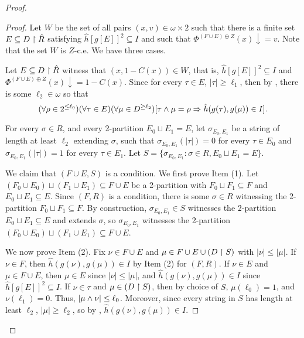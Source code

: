 \begin{proof}
\begin{proof}
Let $W$ be the set of all pairs $(x, v) \in \omega \times 2$ such that there is a finite set $E \subseteq D \upharpoonright \hat{R}$ satisfying $\hat{h}[g[E]]^2 \subseteq I$ and such that $\Phi^{(F \cup E) \oplus Z}(x) \downarrow = v$. Note that the set $W$ is $Z$-c.e. We have three cases.

 Let $E \subseteq D \upharpoonright \hat{R}$ witness that $(x, 1-C(x)) \in W$, that is, $\hat{h}[g[E]]^2 \subseteq I$ and $\Phi^{(F \cup E) \oplus Z}(x) \downarrow = 1-C(x)$. Since for every $\tau \in E$, $|\tau| \geq \ell_1$, then by , there is some $\ell_2 \in \omega$ so that
\begin{equation}\label{eqn:weak-rado-pairs-ca-5}
(\forall \rho \in 2^{\leq \ell_0})(\forall \tau \in E)(\forall \mu \in D^{\geq \ell_2})[\tau \wedge \mu = \rho \Rightarrow \hat{h}(g(\tau), g(\mu)) \in I].
\end{equation}

For every $\sigma \in R$, and every 2-partition $E_0 \sqcup E_1 = E$, let $\sigma_{E_0, E_1}$ be a string of length at least $\ell_2$ extending $\sigma$, such that $\sigma_{E_0, E_1}(|\tau|) = 0$ for every $\tau \in E_0$ and $\sigma_{E_0, E_1}(|\tau|) = 1$ for every $\tau \in E_1$. Let $S = \{\sigma_{E_0, E_1}: \sigma \in R, E_0 \sqcup E_1 = E \}$.

We claim that $(F \cup E, S)$ is a condition.
We first prove Item (1). Let $(F_0 \cup E_0) \sqcup (F_1 \cup E_1) \subseteq F \cup E$ be a 2-partition with $F_0 \sqcup F_1 \subseteq F$ and $E_0 \sqcup E_1 \subseteq E$. Since $(F, R)$ is a condition, there is some $\sigma \in R$ witnessing the 2-partition $F_0 \sqcup F_1 \subseteq F$. By construction, $\sigma_{E_0, E_1} \in S$ witnesses the 2-partition $E_0 \sqcup E_1 \subseteq E$ and extends $\sigma$, so $\sigma_{E_0, E_1}$ witnesses the 2-partition $(F_0 \cup E_0) \sqcup (F_1 \cup E_1) \subseteq F \cup E$.

We now prove Item (2). Fix $\nu \in F \cup E$ and $\mu \in F \cup E \cup (D \upharpoonright S)$ with $|\nu| \leq |\mu|$. If $\nu \in F$, then $\hat{h}(g(\nu), g(\mu)) \in I$ by Item (2) for $(F, R)$.
If $\nu \in E$ and $\mu \in F \cup E$, then $\mu \in E$ since $|\nu| \leq |\mu|$, and $\hat{h}(g(\nu), g(\mu)) \in I$ since $\hat{h}[g[E]]^2 \subseteq I$.
If $\nu \in \tau$ and $\mu \in (D \upharpoonright S)$, then by choice of $S$, $\mu(\ell_0) = 1$, and $\nu(\ell_1) = 0$. Thus, $|\mu \wedge \nu| \leq \ell_0$. Moreover, since every string in $S$ has length at least $\ell_2$, $|\mu| \geq \ell_2$, so by , $\hat{h}(g(\nu), g(\mu)) \in I$.


\end{proof}
\end{proof}

